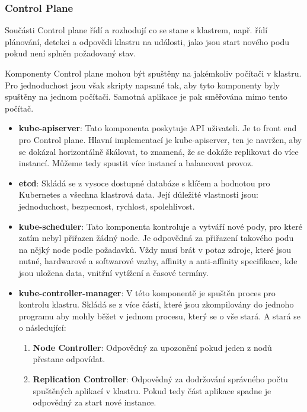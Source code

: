 \subsubsection{Control Plane}

Součásti Control plane řídí a rozhodují co se stane s klastrem, např. řídí plánování, detekci a odpovědi klastru na události, jako jsou start nového podu pokud není splněn požadovaný stav. 

Komponenty Control plane mohou být spuštěny na jakémkoliv počítači v klastru. Pro jednoduchost jsou však skripty napsané tak, aby tyto komponenty byly spuštěny na jednom počítači. Samotná aplikace je pak směřována mimo tento počítač. 

\begin{itemize}

	\item \textbf{kube-apiserver}: Tato komponenta poskytuje API uživateli. Je to front end pro Control plane. Hlavní implementací je kube-apiserver, ten je navržen, aby se dokázal horizontálně škálovat, to znamená, že se dokáže replikovat do více instancí. Můžeme tedy spustit více instancí a balancovat provoz. 

	\item \textbf{etcd}: Skládá se z vysoce dostupné databáze s klíčem a hodnotou pro Kubernetes a všechna klastrová data. Její důležité vlastnosti jsou: jednoduchost, bezpecnost, rychlost, spolehlivost. 

	\item \textbf{kube-scheduler}: Tato komponenta kontroluje a vytváří nové pody, pro které zatím nebyl přiřazen žádný node. Je odpovědná za přiřazení takového podu na nějký node podle požadavků. Vždy musí brát v potaz zdroje, které jsou nutné, hardwarové a softwarové vazby, affinity a anti-affinity specifikace, kde jsou uložena data, vnitřní vytížení a časové termíny.

	\item \textbf{kube-controller-manager}: V této komponentě je spuštěn proces pro kontrolu klastru. Skládá se z více částí, které jsou zkompilovány do jednoho programu aby mohly běžet v jednom procesu, který se o vše stará. A stará se o následující:
	\begin{enumerate}

		\item \textbf{Node Controller}: Odpovědný za upozonění pokud jeden z nodů přestane odpovídat.

		\item \textbf{Replication Controller}: Odpovědný za dodržování správného počtu spuštěných aplikací v klastru. Pokud tedy část aplikace spadne je odpovědný za start nové instance.


\end{enumerate}
\end{itemize}
